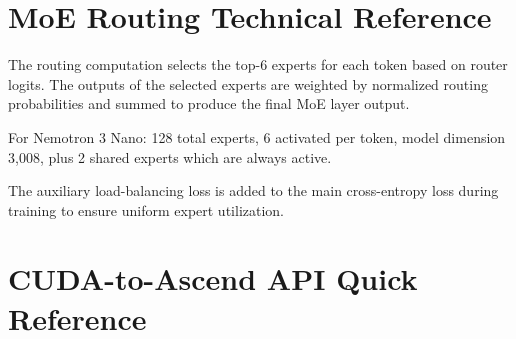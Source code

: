\section{MoE Routing Technical Reference}
\label{app:moe-reference}

The routing computation selects the top-6 experts for each token 
based on router logits. The outputs of the selected experts are 
weighted by normalized routing probabilities and summed to produce 
the final MoE layer output.

\noindent For Nemotron 3 Nano: 128 total experts, 6 activated 
per token, model dimension 3,008, plus 2 shared experts 
which are always active.

The auxiliary load-balancing loss is added to the main 
cross-entropy loss during training to ensure uniform expert utilization.

\section{CUDA-to-Ascend API Quick Reference}
\label{app:api-reference}

